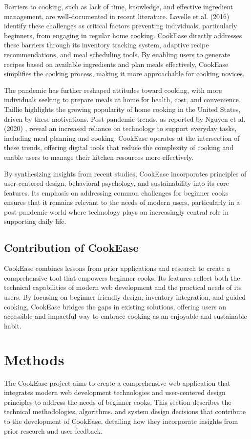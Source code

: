 \documentclass[10pt,twocolumn]{article}
\begin{document}
Barriers to cooking, such as lack of time, knowledge, and effective ingredient management, are well-documented in recent literature. Lavelle et al. (2016) identify these challenges as critical factors preventing individuals, particularly beginners, from engaging in regular home cooking. CookEase directly addresses these barriers through its inventory tracking system, adaptive recipe recommendations, and meal scheduling tools. By enabling users to generate recipes based on available ingredients and plan meals effectively, CookEase simplifies the cooking process, making it more approachable for cooking novices.

The pandemic has further reshaped attitudes toward cooking, with more individuals seeking to prepare meals at home for health, cost, and convenience. Taillie \cite{Taillie2018} highlights the growing popularity of home cooking in the United States, driven by these motivations. Post-pandemic trends, as reported by Nguyen et al. (2020) \cite{Nguyen2020}, reveal an increased reliance on technology to support everyday tasks, including meal planning and cooking. CookEase operates at the intersection of these trends, offering digital tools that reduce the complexity of cooking and enable users to manage their kitchen resources more effectively.

By synthesizing insights from recent studies, CookEase incorporates principles of user-centered design, behavioral psychology, and sustainability into its core features. Its emphasis on addressing common challenges for beginner cooks ensures that it remains relevant to the needs of modern users, particularly in a post-pandemic world where technology plays an increasingly central role in supporting daily life.

\subsection{Contribution of CookEase}
CookEase combines lessons from prior applications and research to create a comprehensive tool that empowers beginner cooks. Its features reflect both the technical capabilities of modern web development and the practical needs of its users. By focusing on beginner-friendly design, inventory integration, and guided cooking, CookEase bridges the gaps in existing solutions, offering users an accessible and impactful way to embrace cooking as an enjoyable and sustainable habit.


\section{Methods}
The CookEase project aims to create a comprehensive web application that integrates modern web development technologies and user-centered design principles to address the needs of beginner cooks. This section describes the technical methodologies, algorithms, and system design decisions that contribute to the development of CookEase, detailing how they incorporate insights from prior research and user feedback.
\end{document}
